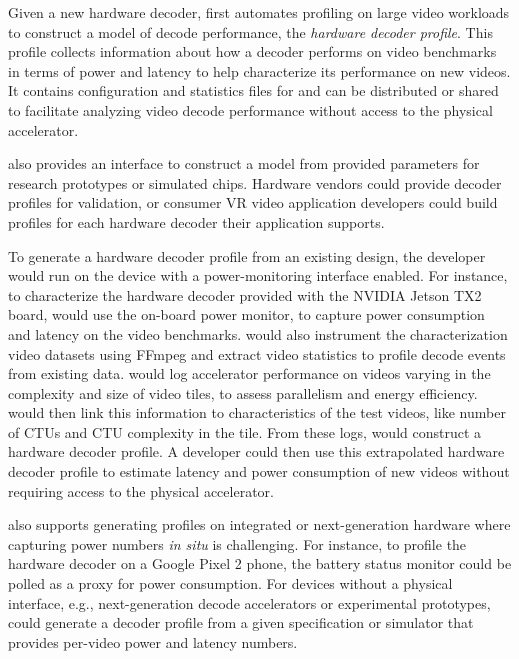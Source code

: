 Given a new hardware decoder, \nameArchprof first automates profiling on large video workloads to construct a model of decode performance, the \emph{hardware decoder profile}.
This profile collects information about how a decoder performs on video benchmarks in terms of power and latency to help characterize its performance on new videos.
It contains configuration and statistics files for \nameArchprof and can be distributed or shared to facilitate analyzing video decode performance without access to the physical accelerator.

\nameArchprof also provides an interface to construct a model from provided parameters for research prototypes or simulated chips.
Hardware vendors could provide \nameArchprof decoder profiles for validation, or consumer VR video application developers could build profiles for each hardware decoder their application supports.

To generate a hardware decoder profile from an existing design, the developer would run \nameArchprof on the device with a power-monitoring interface enabled.
For instance, to characterize the hardware decoder provided with the NVIDIA Jetson TX2 board, \nameArchprof would use the on-board power monitor, to capture power consumption and latency on the video benchmarks.
\nameArchprof would also instrument the characterization video datasets using {FFmpeg}\cite{ffmpeg} and extract video statistics to profile decode events from existing data.
\nameArchprof would log accelerator performance on videos varying in the complexity and size of video tiles, to assess parallelism and energy efficiency.
\nameArchprof would then link this information to characteristics of the test videos, like number of CTUs and CTU complexity in the tile.
From these logs, \nameArchprof would construct a hardware decoder profile.
A developer could then use this extrapolated hardware decoder profile to estimate latency and power consumption of new videos without requiring access to the physical accelerator.

\nameArchprof also supports generating profiles on integrated or next-generation hardware where capturing power numbers \emph{in situ} is challenging.
For instance, to profile the hardware decoder on a Google Pixel 2 phone, the battery status monitor could be polled as a proxy for power consumption.
For devices without a physical interface, e.g., next-generation decode accelerators or experimental prototypes, \nameArchprof could generate a decoder profile from a given specification or simulator that provides per-video power and latency numbers.

